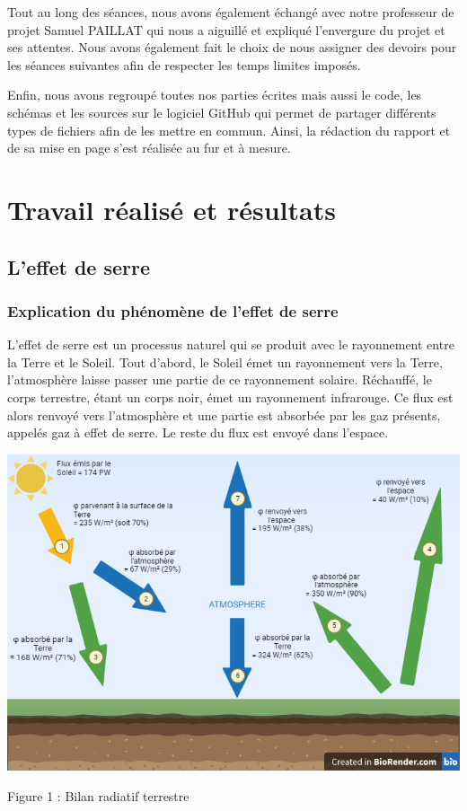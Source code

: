 \documentclass[a4paper, 12pt]{report} %
\begin{document}
Tout au long des séances, nous avons également échangé avec notre professeur de projet Samuel PAILLAT qui nous a aiguillé et expliqué l’envergure du projet et ses attentes.
Nous avons également fait le choix de nous assigner des devoirs pour les séances suivantes afin de respecter les temps limites imposés.\vspace{\baselineskip}

Enfin, nous avons regroupé toutes nos parties écrites mais aussi le code, les schémas et les sources sur le logiciel GitHub qui permet de partager différents types de fichiers afin de les mettre en commun. Ainsi, la rédaction du rapport et de sa mise en page s’est réalisée au fur et à mesure.\vspace{\baselineskip}




\chapter{Travail réalisé et résultats}

\section{L'effet de serre}

\subsection{Explication du phénomène de l'effet de serre}

	L'effet de serre est un processus naturel qui se produit 
avec le rayonnement entre la Terre et le Soleil. Tout d'abord, 
le Soleil émet un rayonnement vers la Terre, l'atmosphère 
laisse passer une partie de ce rayonnement solaire. 
Réchauffé, le corps terrestre, étant un corps noir, émet un rayonnement infrarouge. 
Ce flux est alors renvoyé vers l'atmosphère et une partie est absorbée par les gaz présents, appelés gaz à effet de serre. 
Le reste du flux est envoyé dans l'espace.

\begin{center}
    \includegraphics[scale=0.35]{Images/schemaflux.png} 
    
    Figure 1 : Bilan radiatif terrestre
\end{center} 
\end{document}

